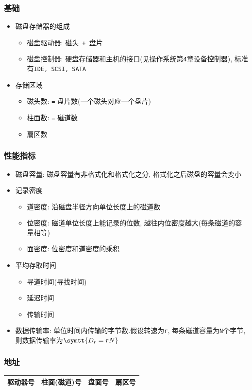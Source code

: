 \subsubsection{基础}
\begin{itemize}
\item 磁盘存储器的组成
\begin{itemize}
\item 磁盘驱动器: 磁头\verb| + |盘片
\item 磁盘控制器: 硬盘存储器和主机的接口(见操作系统第\verb|4|章设备控制器), 标准有\verb|IDE, SCSI, SATA|
\end{itemize}
\item 存储区域
\begin{itemize}
\item 磁头数: \verb|=| 盘片数(一个磁头对应一个盘片)
\item 柱面数: \verb|=| 磁道数
\item 扇区数
\end{itemize}
\end{itemize}
\subsubsection{性能指标}
\begin{itemize}
\item 磁盘容量: 磁盘容量有非格式化和格式化之分, 格式化之后磁盘的容量会变小
\item 记录密度
\begin{itemize}
\item 道密度: 沿磁盘半径方向单位长度上的磁道数
\item 位密度: 磁道单位长度上能记录的位数, 越往内位密度越大(每条磁道的容量相等)
\item 面密度: 位密度和道密度的乘积
\end{itemize}
\item 平均存取时间
\begin{itemize}
\item 寻道时间(寻找时间)
\item 延迟时间
\item 传输时间
\end{itemize}
\item 数据传输率: 单位时间内传输的字节数.\subitem  假设转速为\verb|r|, 每条磁道容量为\verb|N|个字节, 则数据传输率为$ \symtt{D_{r}=rN} $
\end{itemize}
\subsubsection{地址}
\begin{table}[H]
\begin{tabularx}{\textwidth}{|Z|Z|Z|Z|}
\hline
驱动器号 & 柱面(磁道)号 & 盘面号 & 扇区号 \\
\hline
\end{tabularx}
\end{table}
